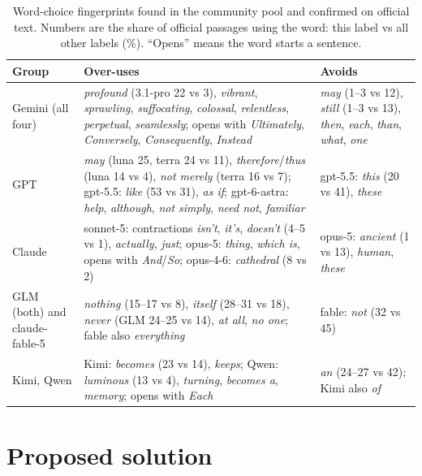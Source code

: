 \documentclass[10pt,twocolumn,letterpaper]{article}
\begin{document}
\begin{table}[t]
\centering\small
\caption{Word-choice fingerprints found in the community pool and confirmed on official text. Numbers are the share of official passages using the word: this label vs all other labels (\%). ``Opens'' means the word starts a sentence.}
\label{tab:words}
\begin{tabular}{p{2.6cm}p{9.2cm}p{4.4cm}}
\toprule
Group & Over-uses & Avoids \\
\midrule
Gemini (all four) & \emph{profound} (3.1-pro 22 vs 3), \emph{vibrant}, \emph{sprawling}, \emph{suffocating}, \emph{colossal}, \emph{relentless}, \emph{perpetual}, \emph{seamlessly}; opens with \emph{Ultimately}, \emph{Conversely}, \emph{Consequently}, \emph{Instead} & \emph{may} (1--3 vs 12), \emph{still} (1--3 vs 13), \emph{then}, \emph{each}, \emph{than}, \emph{what}, \emph{one} \\
GPT & \emph{may} (luna 25, terra 24 vs 11), \emph{therefore}/\emph{thus} (luna 14 vs 4), \emph{not merely} (terra 16 vs 7); gpt-5.5: \emph{like} (53 vs 31), \emph{as if}; gpt-6-astra: \emph{help}, \emph{although}, \emph{not simply}, \emph{need not}, \emph{familiar} & gpt-5.5: \emph{this} (20 vs 41), \emph{these} \\
Claude & sonnet-5: contractions \emph{isn't}, \emph{it's}, \emph{doesn't} (4--5 vs 1), \emph{actually}, \emph{just}; opus-5: \emph{thing}, \emph{which is}, opens with \emph{And}/\emph{So}; opus-4-6: \emph{cathedral} (8 vs 2) & opus-5: \emph{ancient} (1 vs 13), \emph{human}, \emph{these} \\
GLM (both) and claude-fable-5 & \emph{nothing} (15--17 vs 8), \emph{itself} (28--31 vs 18), \emph{never} (GLM 24--25 vs 14), \emph{at all}, \emph{no one}; fable also \emph{everything} & fable: \emph{not} (32 vs 45) \\
Kimi, Qwen & Kimi: \emph{becomes} (23 vs 14), \emph{keeps}; Qwen: \emph{luminous} (13 vs 4), \emph{turning}, \emph{becomes a}, \emph{memory}; opens with \emph{Each} & \emph{an} (24--27 vs 42); Kimi also \emph{of} \\
\bottomrule
\end{tabular}
\end{table}

\section{Proposed solution}
\label{sec:method}
\end{document}
